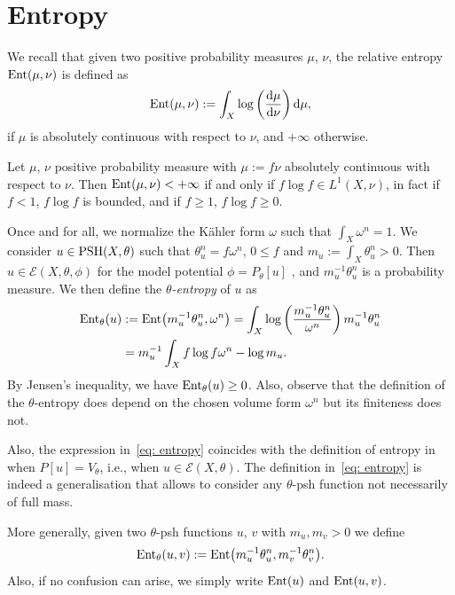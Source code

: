 \documentclass[pdftex]{sigma}
\numberwithin{equation}{section}
\theoremstyle{plain}
\newcommand \psh {{\rm PSH}}
\newcommand \Ent{{\rm Ent}}
\begin{document}
\section{Entropy}
 We recall that given two positive probability measures $\mu$, $\nu$, the relative entropy $\Ent(\mu, \nu)$ is defined as
\[
\Ent(\mu, \nu) := \int_X \log\left (\frac{{\rm d}\mu}{{\rm d}\nu}\right) {\rm d}\mu,
\]
if $\mu$ is absolutely continuous with respect to $\nu$, and $+\infty$ otherwise.

\begin{Remark}
Let $\mu$, $\nu$ positive probability measure with $\mu := f \nu $ absolutely continuous with respect to $\nu$. Then $\Ent(\mu,\nu) < + \infty$ if and only if $f\log f \in L^1(X,\nu)$, in fact if $f < 1$, $f \log f$ is bounded, and if $f \geq 1$, $f \log f \geq 0$. \label{L^1}
\end{Remark}

Once and for all, we normalize the K\"ahler form $\omega$ such that $\int_X \omega^n=1$. We consider $u\in \psh(X, \theta)$ such that $\theta_u^n=f \omega^n$, $0 \leq f$ and $m_u:=\int_X \theta_u^n >0$. Then $ u\in \mathcal{E}(X, \theta, \phi)$ for the model potential $\phi=P_\theta[u]$ \cite[Theorem 1.3]{DDL2}, and $m_u^{-1}\theta_u^n$ is a probability measure. We then define the $\theta$\emph{-entropy} of $u$ as
\begin{align}
 {\rm Ent}_\theta(u)&:= {\rm Ent}\big( m_u^{-1}\theta_u^n, {\omega^n}\big)=\int_X \log \left( \frac{m_u^{-1}\theta_u^n}{\omega^n} \right) m_u^{-1}\theta_u^n\nonumber\\
 &= m_u^{-1} \int_X f\log f \omega^n-\log m_u.\label{eq: entropy}
 \end{align}
By Jensen’s inequality, we have ${\rm Ent}_\theta(u)\geq 0$. Also, observe that the definition of the $\theta$-entropy does depend on the chosen volume form $\omega^n$ but its finiteness does not.

Also, the expression in~\eqref{eq: entropy} coincides with the definition of entropy in \cite{DGL20} when $P[u]=V_\theta$, i.e., when $u\in \mathcal{E}(X, \theta)$. The definition in~\eqref{eq: entropy} is indeed a generalisation that allows to consider any $\theta$-psh function not necessarily of full mass.

More generally, given two $\theta$-psh functions $u$, $v$ with $m_u, m_v>0$ we define
\[{\rm Ent}_\theta(u,v) :={\rm Ent}\big( m_u^{-1}\theta_u^n, m_v^{-1}\theta_v^n\big). \]
Also, if no confusion can arise, we simply write ${\rm Ent} (u) $ and ${\rm Ent} (u,v) $.
\end{document}
